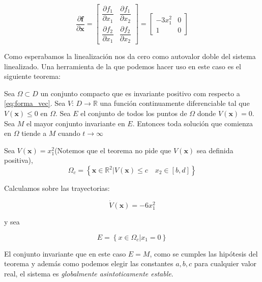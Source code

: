 \documentclass[10pt]{article}
\begin{document}
\begin{equation}
\dfrac{\partial \mathbf{f}}{\partial \mathbf{x}}=
\begin{bmatrix}
 \dfrac{\partial f_1}{\partial x_1}& \dfrac{\partial f_1}{\partial x_2} \\ 
\dfrac{\partial f_2}{\partial x_1}& \dfrac{\partial f_2}{\partial x_2}
\end{bmatrix} 
=
\begin{bmatrix}
    -3x_{1}^{2} & 0\\
1 & 0 
\end{bmatrix}
\label{eq:jaco_sis3}
\end{equation}

Como esperabamos la linealización nos da cero como autovalor doble del sistema linealizado. 
Una herramienta de la que podemos hacer uso en este caso es el siguiente teorema:

\begin{teo}[LaSalle]
    Sea $\Omega \subset D$  un conjunto compacto que es invariante positivo com respecto a \eqref{eq:forma_vec}. Sea 
    $V:\, D \rightarrow \mathbb{R} $ una función continuamente diferenciable tal que $V(\mathbf{x}) \leq 0$ en $\Omega$. Sea 
    $E$ el conjunto de todos los puntos de $\Omega$ donde $V(\mathbf{x})=0$. Sea $M$ el mayor conjunto invariante en $E$. Entonces 
    toda solución que comienza en $\Omega$ tiende a $M$ cuando $t \rightarrow \infty$
\end{teo}

Sea $V(\mathbf{x})=x_{1}^{2}$(Notemos que el teorema no pide que $V(\mathbf{x})$ sea definida positiva), 
\begin{equation}
    \Omega_{c} = \left\{\mathbf{x} \in \mathbb{R}^{2}| V(\mathbf{x}) \leq c \quad x_{2} \in [b,d]\right\} 
\end{equation}

Calculamos sobre las trayectorias: 

\begin{equation}
    \dot{V}(\mathbf{x})=-6 x_{1}^{2}
\end{equation}

y sea 

\begin{equation}
    E = \left\{ x \in \Omega_{c}|x_{1}=0 \right\}
\end{equation}

El conjunto invariante que en este caso $E=M$, como se cumples las hipótesis del teorema y además como podemos elegir las constantes
$a,b,c$ para cualquier valor real, el sistema es \textit{globalmente asintoticamente estable}.
\end{document}
